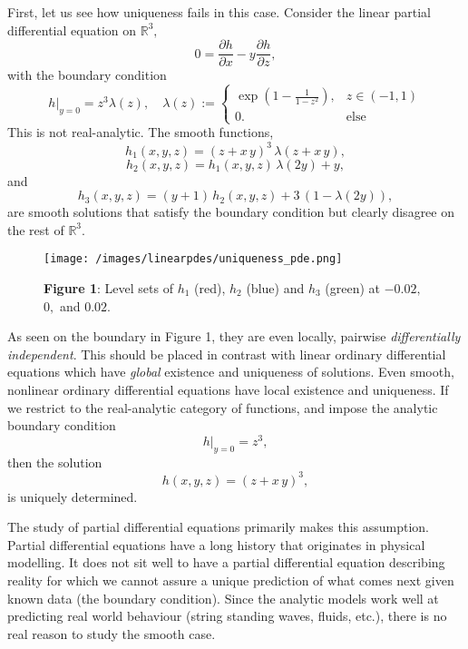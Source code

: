 First, let us see how uniqueness fails in this case.
Consider the linear partial differential equation on \(\mathbb{R}^3,\)
\[
  0
    =
      \frac{\partial h}{\partial x}
      -
      y
      \frac{\partial h}{\partial z},
\]
with the boundary condition
\[
  \left. h \right|_{y = 0} = z^3 \lambda(z),
  \quad
  \lambda(z) := \left\{
    \begin{array}{ll}
      \exp\left( 1 - \frac{1}{1 - z^2} \right), & z\in(-1, 1)\\
      0. & \text{else}
    \end{array}
  \right.
\]
This is not real-analytic.
The smooth functions,
\[
  h_1(x, y, z) =
    (z + x\, y)^3\,\lambda(z + x\, y),
\]
\[
  h_2(x, y, z) = h_1(x, y, z)\, \lambda(2 y) + y,
\]
and
\[
  h_3(x, y, z) =
    (y + 1)\, h_2(x, y, z) + 3\,(1 - \lambda(2 y)),
\]
are smooth solutions that satisfy the boundary condition but clearly disagree on the rest of \(\mathbb{R}^3.\)
\begin{figure}
  \texttt{[image: /images/linearpdes/uniqueness\_pde.png]}
  \caption{%
    \textbf{Figure 1}: Level sets of \(h_1\) (red), \(h_2\) (blue) and \(h_3\) (green) at \(-0.02,\) \(0,\) and \(0.02.\)%
  }
\end{figure}
As seen on the boundary in Figure 1, they are even locally, pairwise \emph{differentially independent}.
This should be placed in contrast with linear ordinary differential equations which have \emph{global} existence and uniqueness of solutions.
Even smooth, nonlinear ordinary differential equations have local existence and uniqueness.
If we restrict to the real-analytic category of functions, and impose the analytic boundary condition
\[
  \left. h \right|_{y = 0} = z^3,
\]
then the solution
\[
  h(x, y, z) = (z + x\, y)^3,
\]
is uniquely determined.

The study of partial differential equations primarily makes this assumption.
Partial differential equations have a long history that originates in physical modelling.
It does not sit well to have a partial differential equation describing reality for which we cannot assure a unique prediction of what comes next given known data (the boundary condition).
Since the analytic models work well at predicting real world behaviour (string standing waves, fluids, etc.), there is no real reason to study the smooth case.

